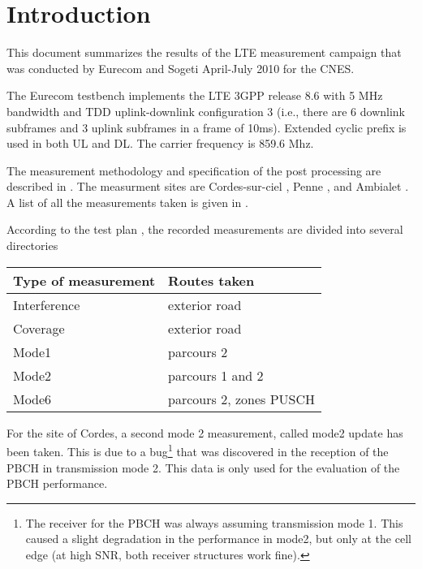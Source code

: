 \documentclass[a4paper,10pt]{article}
\begin{document}

\section{Introduction}

This document summarizes the results of the LTE measurement campaign that was conducted by Eurecom and Sogeti April-July 2010 for the CNES.

The Eurecom testbench implements the LTE 3GPP release 8.6 \cite{3GPPTS36.211,3GPPTS36.212,3GPPTS36.213} with 5 MHz bandwidth and TDD uplink-downlink configuration 3 (i.e., there are 6 downlink subframes and 3 uplink subframes in a frame of 10ms). Extended cyclic prefix is used in both UL and DL. The carrier frequency is 859.6 Mhz. 
 
The measurement methodology and specification of the post processing are described in \cite{measurements_spec}. The measurment sites are Cordes-sur-ciel \cite{cordes_desc}, Penne \cite{penne_desc}, and Ambialet \cite{ambialet_desc}. A list of all the measurements taken is given in \cite{measurements_spreadsheet}. 

According to the test plan \cite{test_plan}, the recorded measurements are divided into several directories
\begin{center}
\begin{tabular}{l|p{6cm}}
Type of measurement & Routes taken \\ 
\hline
Interference & exterior road \\ 
Coverage & exterior road \\ 
Mode1 & parcours 2 \\ 
Mode2 & parcours 1 and 2 \\ 
Mode6 & parcours 2, zones PUSCH \\ 
\end{tabular}
\end{center}

For the site of Cordes, a second mode 2 measurement, called mode2 update has been taken. This is due to a bug\footnote{The receiver for the PBCH was always assuming transmission mode 1. This caused a slight degradation in the performance in mode2, but only at the cell edge (at high SNR, both receiver structures work fine).} that was discovered in the reception of the PBCH in transmission mode 2. This data is only used for the evaluation of the PBCH performance.
\end{document}

